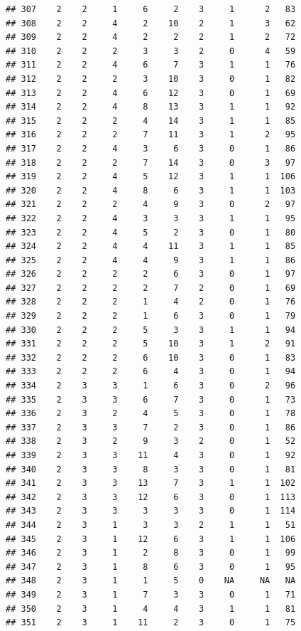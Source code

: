 \documentclass[krantz2,ChapterTOCs]{krantz}\usepackage{knitr}
\begin{document}
\begin{knitrout}
\begin{kframe}
\begin{verbatim}
## 307    2    2     1     6     2    3     1      2   83
## 308    2    2     4     2    10    2     1      3   62
## 309    2    2     4     2     2    2     1      2   72
## 310    2    2     2     3     3    2     0      4   59
## 311    2    2     4     6     7    3     1      1   76
## 312    2    2     2     3    10    3     0      1   82
## 313    2    2     4     6    12    3     0      1   69
## 314    2    2     4     8    13    3     1      1   92
## 315    2    2     2     4    14    3     1      1   85
## 316    2    2     2     7    11    3     1      2   95
## 317    2    2     4     3     6    3     0      1   86
## 318    2    2     2     7    14    3     0      3   97
## 319    2    2     4     5    12    3     1      1  106
## 320    2    2     4     8     6    3     1      1  103
## 321    2    2     2     4     9    3     0      2   97
## 322    2    2     4     3     3    3     1      1   95
## 323    2    2     4     5     2    3     0      1   80
## 324    2    2     4     4    11    3     1      1   85
## 325    2    2     4     4     9    3     1      1   86
## 326    2    2     2     2     6    3     0      1   97
## 327    2    2     2     2     7    2     0      1   69
## 328    2    2     2     1     4    2     0      1   76
## 329    2    2     2     1     6    3     0      1   79
## 330    2    2     2     5     3    3     1      1   94
## 331    2    2     2     5    10    3     1      2   91
## 332    2    2     2     6    10    3     0      1   83
## 333    2    2     2     6     4    3     0      1   94
## 334    2    3     3     1     6    3     0      2   96
## 335    2    3     3     6     7    3     0      1   73
## 336    2    3     2     4     5    3     0      1   78
## 337    2    3     3     7     2    3     0      1   86
## 338    2    3     2     9     3    2     0      1   52
## 339    2    3     3    11     4    3     0      1   92
## 340    2    3     3     8     3    3     0      1   81
## 341    2    3     3    13     7    3     1      1  102
## 342    2    3     3    12     6    3     0      1  113
## 343    2    3     3     3     3    3     0      1  114
## 344    2    3     1     3     3    2     1      1   51
## 345    2    3     1    12     6    3     1      1  106
## 346    2    3     1     2     8    3     0      1   99
## 347    2    3     1     8     6    3     0      1   95
## 348    2    3     1     1     5    0    NA     NA   NA
## 349    2    3     1     7     3    3     0      1   71
## 350    2    3     1     4     4    3     1      1   81
## 351    2    3     1    11     2    3     0      1   75

\end{verbatim}
\end{kframe}
\end{knitrout}
\end{document}
